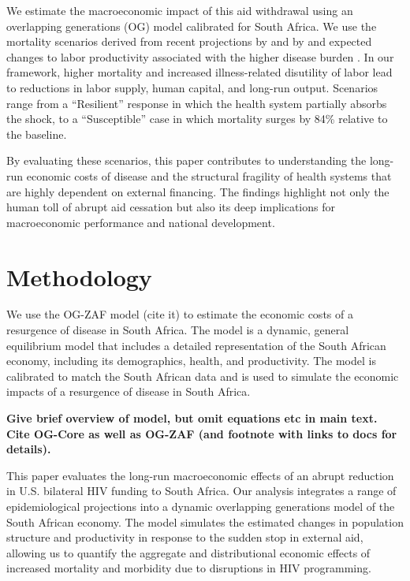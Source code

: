 \documentclass[letterpaper,12pt]{article}
\theoremstyle{definition}
\begin{document}
\begin{spacing}{1.5}
We estimate the macroeconomic impact of this aid withdrawal using an overlapping generations (OG) model calibrated for South Africa. We use the mortality scenarios derived from recent projections by \citet{KS2025} and by \citet{Gandhi2025} and expected changes to labor productivity associated with the higher disease burden \citep{Keogh2024,Panda2024}. In our framework, higher mortality and increased illness-related disutility of labor lead to reductions in labor supply, human capital, and long-run output. Scenarios range from a ``Resilient'' response in which the health system partially absorbs the shock, to a ``Susceptible'' case in which mortality surges by 84\% relative to the baseline.

By evaluating these scenarios, this paper contributes to understanding the long-run economic costs of disease and the structural fragility of health systems that are highly dependent on external financing. The findings highlight not only the human toll of abrupt aid cessation but also its deep implications for macroeconomic performance and national development.


\section{Methodology}\label{SecMethod}

We use the OG-ZAF model (cite it) to estimate the economic costs of a resurgence of disease in South Africa.  The model is a dynamic, general equilibrium model that includes a detailed representation of the South African economy, including its demographics, health, and productivity.  The model is calibrated to match the South African data and is used to simulate the economic impacts of a resurgence of disease in South Africa.

\textbf{Give brief overview of model, but omit equations etc in main text.  Cite OG-Core as well as OG-ZAF (and footnote with links to docs for details).}

This paper evaluates the long-run macroeconomic effects of an abrupt reduction in U.S. bilateral HIV funding to South Africa. Our analysis integrates a range of epidemiological projections into a dynamic overlapping generations model of the South African economy. The model simulates the estimated changes in population structure and productivity in response to the sudden stop in external aid, allowing us to quantify the aggregate and distributional economic effects of increased mortality and morbidity due to disruptions in HIV programming.


\end{spacing}
\end{document}
